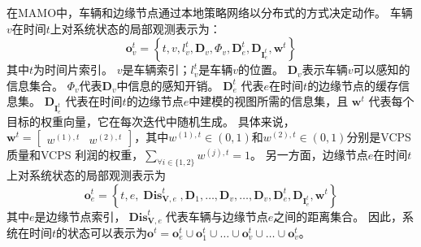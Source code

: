 在MAMO中，车辆和边缘节点通过本地策略网络以分布式的方式决定动作。
车辆$v$在时间$t$上对系统状态的局部观测表示为：
	\begin{equation}
		\boldsymbol{o}_{v}^{t}=\left\{t, v, l_{v}^t, \mathbf{D}_{v}, \Phi_{v}, \mathbf{D}_{e}^{t}, \mathbf{D}_{\mathbf{I}_e^t}, \boldsymbol{w}^{t}\right\}
	\end{equation} 
\noindent 其中$t$为时间片索引。
$v$是车辆索引；$l_{v}^t$是车辆$v$的位置。
$\mathbf{D}_{v}$表示车辆$v$可以感知的信息集合。
$\Phi_{v}$代表$\mathbf{D}_{v}$中信息的感知开销。
$\mathbf{D}_{e}^{t}$ 代表$e$在时间$t$的边缘节点的缓存信息集。
$\mathbf{D}_{\mathbf{I}_e^t}$ 代表在时间$t$的边缘节点$e$中建模的视图所需的信息集，且 $\boldsymbol{w}^{t}$ 代表每个目标的权重向量，它在每次迭代中随机生成。
具体来说，$\boldsymbol{w}^{t} = \begin{bmatrix}  w^{(1), t}  &  w^{(2), t} \end{bmatrix}$，其中$w^{(1), t} \in (0, 1)$和$w^{(2), t} \in (0, 1)$分别是VCPS质量和VCPS 利润的权重，$\sum_{\forall i \in \{1, 2\}} w^{(j), t} = 1$。
另一方面，边缘节点$e$在时间$t$上对系统状态的局部观测表示为
\begin{equation}
	\boldsymbol{o}_{e}^{t}=\left\{t, e, \operatorname{\mathbf{Dis}}_{\mathbf{V}, e}^{t}, \mathbf{D}_{1}, \ldots, \mathbf{D}_{v}, \ldots, \mathbf{D}_{v}, \mathbf{D}_{e}^{t}, \mathbf{D}_{\mathbf{I}_e^t}, \boldsymbol{w}^{t} \right\}
\end{equation}
\noindent 其中$e$是边缘节点索引，$\operatorname{\mathbf{Dis}}_{\mathbf{V}, e}^{t}$代表车辆与边缘节点$e$之间的距离集合。
因此，系统在时间$t$的状态可以表示为$\boldsymbol{o}^{t}=\boldsymbol{o}_{e}^{t} \cup \boldsymbol{o}_{1}^{t} \cup \ldots \cup \boldsymbol{o}_{v}^{t} \cup \ldots \cup \boldsymbol{o}_{v}^{t}$。

